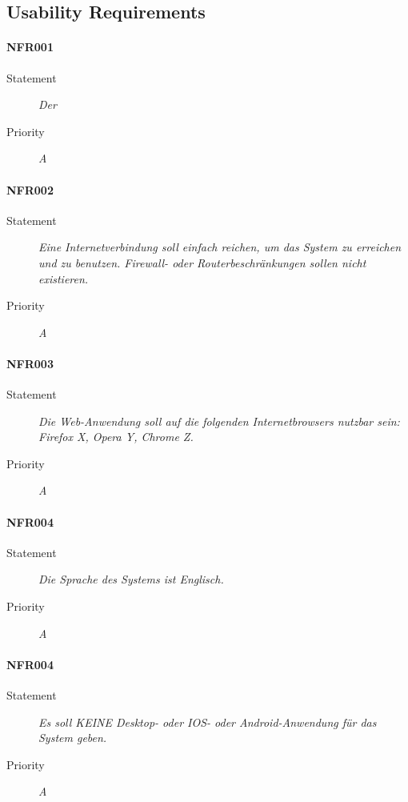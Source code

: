 \subsection{Usability Requirements}

\paragraph{NFR001}
\begin{description}
\item[Statement] \textit{Der }
\item[Priority] \textit{A}
\end{description}

\paragraph{NFR002}
\begin{description}
\item[Statement] \textit{Eine Internetverbindung soll einfach reichen, um das System zu erreichen und zu benutzen. Firewall- oder Routerbeschränkungen sollen nicht existieren.}
\item[Priority] \textit{A}
\end{description}

\paragraph{NFR003}
\begin{description}
\item[Statement] \textit{Die Web-Anwendung soll auf die folgenden Internetbrowsers nutzbar sein: Firefox X, Opera Y, Chrome Z.}
\item[Priority] \textit{A}
\end{description}

\paragraph{NFR004}
\begin{description}
\item[Statement] \textit{Die Sprache des Systems ist Englisch.}
\item[Priority] \textit{A}
\end{description}

\paragraph{NFR004}
\begin{description}
\item[Statement] \textit{Es soll KEINE Desktop- oder IOS- oder Android-Anwendung für das System geben.}
\item[Priority] \textit{A}
\end{description}

